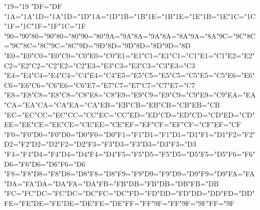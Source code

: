
\def\`#1{%
  \if#1a^^e0\else
  \if#1e^^e8\else
  \if#1i^^ec\else
  \if#1o^^f2\else
  \if#1u^^f9\else
  \if#1A^^c0\else
  \if#1E^^c8\else
  \if#1I^^cc\else
  \if#1O^^d2\else
  \if#1U^^d9\else
  \if#1\i^^ec\else
  {\accent18 #1}%
  \fi\fi\fi\fi\fi\fi\fi\fi\fi\fi\fi}

\def\'#1{%
  \if#1a^^e1\else
  \if#1e^^e9\else
  \if#1i^^ed\else
  \if#1o^^f3\else
  \if#1u^^fa\else
  \if#1y^^fd\else
  \if#1A^^c1\else
  \if#1E^^c9\else
  \if#1I^^cd\else
  \if#1O^^d3\else
  \if#1U^^da\else
  \if#1Y^^dd\else
  \if#1\i^^ed\else
  {\accent19 #1}%
  \fi\fi\fi\fi\fi\fi\fi\fi\fi\fi\fi\fi\fi}

\def\^#1{%
  \if#1a^^e2\else
  \if#1e^^ea\else
  \if#1i^^ee\else
  \if#1o^^f4\else
  \if#1u^^fb\else
  \if#1A^^c2\else
  \if#1E^^ca\else
  \if#1I^^ce\else
  \if#1O^^d4\else
  \if#1U^^db\else
  \if#1\i^^ee\else
  {\accent94 #1}%
  \fi\fi\fi\fi\fi\fi\fi\fi\fi\fi\fi}

\def\~#1{%
  \if#1a^^e3\else
  \if#1n^^f1\else
  \if#1o^^f5\else
  \if#1A^^c3\else
  \if#1N^^d1\else
  \if#1O^^d5\else
  {\accent126 #1}%
  \fi\fi\fi\fi\fi\fi}

\def\"#1{%
  \if#1a^^e4\else
  \if#1e^^eb\else
  \if#1i^^ef\else
  \if#1o^^f6\else
  \if#1u^^fc\else
  \if#1y^^ff\else
  \if#1A^^c4\else
  \if#1E^^cb\else
  \if#1I^^cf\else
  \if#1O^^d6\else
  \if#1U^^dc\else
  \if#1Y^^9f\else
  \if#1\i^^ef\else
  {\accent168 #1}%
  \fi\fi\fi\fi\fi\fi\fi\fi\fi\fi\fi\fi\fi}

\def\v#1{%
  \if#1s^^9a\else
  \if#1z^^9d\else
  \if#1S^^8a\else
  \if#1Z^^8d\else
  {\accent20 #1}%
  \fi\fi\fi\fi}

\def\r#1{%
  \if#1a^^e5\else
  \if#1A^^c5\else
  {\accent23 #1}%
  \fi\fi}

\def\c#1{%
  \if#1c^^e7\else
  \if#1C^^c7\else
  {\setbox\z@\hbox{#1}\ifdim\ht\z@=1ex\accent24 #1%
   \else{\ooalign{\hidewidth\char24\hidewidth\crcr\unhbox\z@}}\fi}%
  \fi\fi}

\def\H#1{{\accent6 #1}}
\def\.#1{{\accent5 #1}}
\def\k#1{\setbox\z@\hbox{#1}\ifdim\ht\z@=1ex\accent7 #1%
  \else{\ooalign{\hidewidth\char7\hidewidth\crcr\unhbox\z@}}\fi}

\lccode"19="19 \lccode"DF="DF %
\def\lowup#1#2{\lccode#1=#1\lccode#2=#1\uccode#2=#2\uccode#1=#2}
\lowup{"1A}{"1D}\lowup{"1B}{"1E}\lowup{"1C}{"1F}
\lowup{"90}{"80}\lowup{"9A}{"8A}\lowup{"9C}{"8C}\lowup{"9D}{"8D}
\lowup{"E0}{"C0}\lowup{"E1}{"C1}\lowup{"E2}{"C2}\lowup{"E3}{"C3}
\lowup{"E4}{"C4}\lowup{"E5}{"C5}\lowup{"E6}{"C6}\lowup{"E7}{"C7}
\lowup{"E8}{"C8}\lowup{"E9}{"C9}\lowup{"EA}{"CA}\lowup{"EB}{"CB}
\lowup{"EC}{"CC}\lowup{"ED}{"CD}\lowup{"EE}{"CE}\lowup{"EF}{"CF}
\lowup{"F0}{"D0}\lowup{"F1}{"D1}\lowup{"F2}{"D2}\lowup{"F3}{"D3}
\lowup{"F4}{"D4}\lowup{"F5}{"D5}\lowup{"F6}{"D6}
\lowup{"F8}{"D8}\lowup{"F9}{"D9}\lowup{"FA}{"DA}\lowup{"FB}{"DB}
\lowup{"FC}{"DC}\lowup{"FD}{"DD}\lowup{"FE}{"DE}\lowup{"FF}{"9F}
\let\lowup=\undefined

